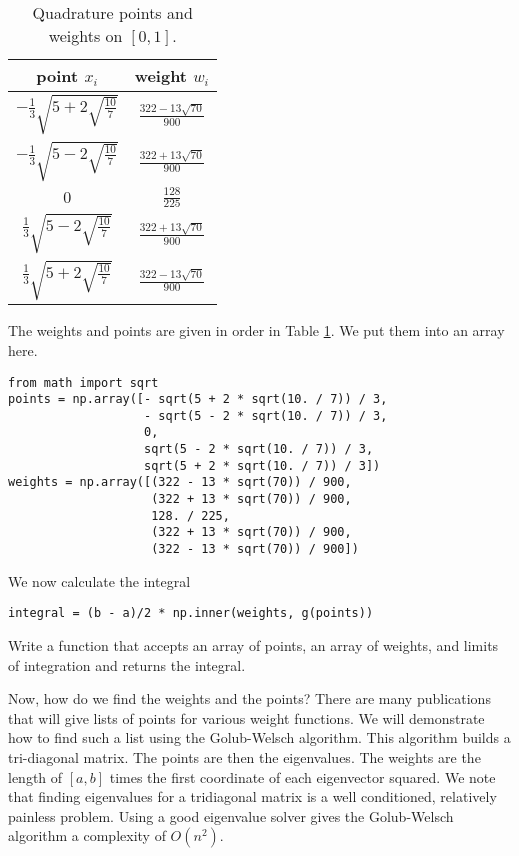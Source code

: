 \begin{table}[h!]
\begin{center}
\begin{tabular}{|c|c|}
\hline
point $x_i$ & weight $w_i$ \\
\hline
$-\frac{1}{3}\sqrt{5 + 2\sqrt{\frac{10}{7}}}$ &  $\frac{322-13\sqrt{70}}{900}$ \\
\hline
$-\frac{1}{3}\sqrt{5 - 2\sqrt{\frac{10}{7}}}$ & $\frac{322+13\sqrt{70}}{900}$ \\
\hline
$0$ & $\frac{128}{225}$ \\
\hline
$\frac{1}{3}\sqrt{5 - 2\sqrt{\frac{10}{7}}}$ & $\frac{322+13\sqrt{70}}{900}$ \\
\hline
$\frac{1}{3}\sqrt{5 + 2\sqrt{\frac{10}{7}}}$ & $\frac{322-13\sqrt{70}}{900}$ \\
\hline
\end{tabular}
\end{center}
\caption{Quadrature points and weights on $\left[0, 1\right]$.}
\label{intro_table}
\end{table}

The weights and points are given in order in Table \ref{intro_table}.
We put them into an array here.

\begin{lstlisting}
from math import sqrt
points = np.array([- sqrt(5 + 2 * sqrt(10. / 7)) / 3,
                   - sqrt(5 - 2 * sqrt(10. / 7)) / 3,
                   0,
                   sqrt(5 - 2 * sqrt(10. / 7)) / 3,
                   sqrt(5 + 2 * sqrt(10. / 7)) / 3])
weights = np.array([(322 - 13 * sqrt(70)) / 900,
                    (322 + 13 * sqrt(70)) / 900,
                    128. / 225,
                    (322 + 13 * sqrt(70)) / 900,
                    (322 - 13 * sqrt(70)) / 900])
\end{lstlisting}

We now calculate the integral

\begin{lstlisting}
integral = (b - a)/2 * np.inner(weights, g(points))
\end{lstlisting}

\begin{problem}

Write a function that accepts an array of points, an array of weights, and limits of integration and returns the integral.

\end{problem}

Now, how do we find the weights and the points?
There are many publications that will give lists of points for various weight functions.
We will demonstrate how to find such a list using the Golub-Welsch algorithm.
This algorithm builds a tri-diagonal matrix.
The points are then the eigenvalues.
The weights are the length of $\left[a, b\right]$ times the first coordinate of each eigenvector squared.
We note that finding eigenvalues for a tridiagonal matrix is a well conditioned, relatively painless problem.
Using a good eigenvalue solver gives the Golub-Welsch algorithm a complexity of $O(n^2)$.


